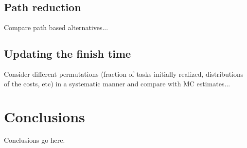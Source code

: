 \documentclass[12pt]{article}
\begin{document}

\subsection{Path reduction}
\label{subsect.results_path}

Compare path based alternatives...

\subsection{Updating the finish time}
\label{subsect.results_updating}

Consider different permutations (fraction of tasks initially realized, distributions of the costs, etc) in a systematic manner and compare with MC estimates... 

\section{Conclusions}
\label{sect.conclusions}

Conclusions go here. 



\end{document}
